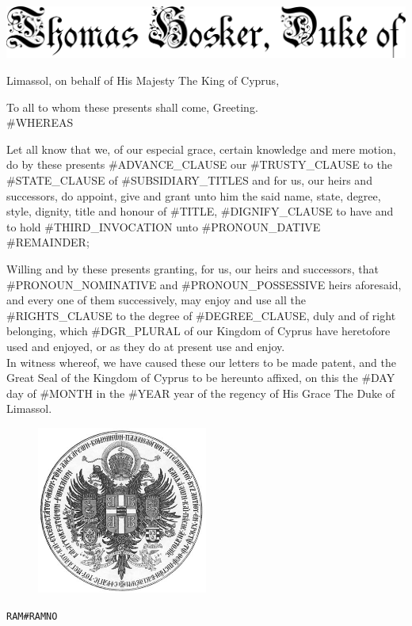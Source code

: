 \documentclass[varwidth=true,border=50pt]{standalone}
\begin{document}
\thispagestyle{fancy}

\noindent \includegraphics[width=\textwidth]{thomas_hosker_duke_of}

{\LARGE
Limassol, on behalf of His Majesty The King of Cyprus,

\hspace{20pt} To all to whom these presents shall come, Greeting.\\

#WHEREAS

\hspace{20pt} Let all know that we, of our especial grace, certain knowledge and mere motion, do by these presents #ADVANCE_CLAUSE our #TRUSTY_CLAUSE \hspace{7pt}{\hoskeroe #GRANTEE}\hspace{7pt} to the #STATE_CLAUSE of \hspace{7pt}{\hoskeroe #TITLE}\hspace{7pt} #SUBSIDIARY_TITLES and for us, our heirs and successors, do appoint, give and grant unto him the said name, state, degree, style, dignity, title and honour of #TITLE, #DIGNIFY_CLAUSE to have and to hold #THIRD_INVOCATION unto #PRONOUN_DATIVE #REMAINDER;

\hspace{20pt} Willing and by these presents granting, for us, our heirs and successors, that #PRONOUN_NOMINATIVE and #PRONOUN_POSSESSIVE heirs aforesaid, and every one of them successively, may enjoy and use all the #RIGHTS_CLAUSE to the degree of #DEGREE_CLAUSE, duly and of right belonging, which #DGR_PLURAL of our Kingdom of Cyprus have heretofore used and enjoyed, or as they do at present use and enjoy.\\

\hspace{20pt} In witness whereof, we have caused these our letters to be made patent, and the Great Seal of the Kingdom of Cyprus to be hereunto affixed, on this the #DAY day of #MONTH in the #YEAR year of the regency of His Grace The Duke of Limassol.
}

\begin{figure}[h]
\centering
\includegraphics[width=0.5\textwidth]{seal}
\end{figure}

\hfill {\footnotesize \texttt{RAM{#RAMNO}}}
\end{document}
